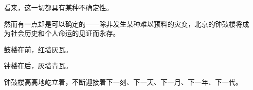 \par 看来，这一切都具有某种不确定性。
\par 然而有一点却是可以确定的——除非发生某种难以预料的灾变，北京的钟鼓楼将成为社会历史和个人命运的见证而永存。
\par 鼓楼在前，红墙灰瓦。
\par 钟楼在后，灰墙青瓦。
\par 钟鼓楼高高地屹立着，不断迎接着下一刻、下一天、下一月、下一年、下一代。
\par {}
\par {}











